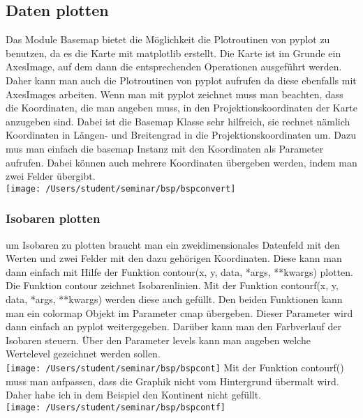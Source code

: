 \subsection{Daten plotten}
\label{sec:potdata}
Das Module \textsf{Basemap} bietet die Möglichkeit die Plotroutinen von \textsf{pyplot} zu benutzen, da es die Karte mit \textsf{matplotlib} erstellt. Die Karte ist im Grunde ein \textsf{AxesImage}, auf dem dann die entsprechenden Operationen ausgeführt werden. Daher kann man auch die Plotroutinen von \textsf{pyplot} aufrufen da diese ebenfalls mit \textsf{AxesImages} arbeiten. Wenn man mit \textsf{pyplot} zeichnet muss man beachten, dass die Koordinaten, die man angeben muss, in den Projektionskoordinaten der Karte anzugeben sind. Dabei ist die \textsf{Basemap} Klasse sehr hilfreich, sie rechnet nämlich Koordinaten in Längen- und Breitengrad in die Projektionskoordinaten um. Dazu mus man einfach die \textsf{basemap} Instanz mit den Koordinaten als Parameter aufrufen. Dabei können auch mehrere Koordinaten übergeben werden, indem man zwei Felder übergibt.\\

\texttt{[image: /Users/student/seminar/bsp/bspconvert]}\newpage
\subsubsection{Isobaren plotten}
um Isobaren zu plotten braucht man ein zweidimensionales Datenfeld mit den Werten und zwei Felder mit den dazu gehörigen Koordinaten. Diese kann man dann einfach mit Hilfe der Funktion \textsf{contour(x, y, data, *args, **kwargs)} plotten. Die Funktion \textsf{contour} zeichnet Isobarenlinien. Mit der Funktion \textsf{contourf(x, y, data, *args, **kwargs)} werden diese auch gefüllt. Den beiden Funktionen kann man ein \textsf{colormap} Objekt im Parameter \textsf{cmap} übergeben. Dieser Parameter wird dann einfach an \textsf{pyplot} weitergegeben. Darüber kann man den Farbverlauf der Isobaren steuern. Über den Parameter \textsf{levels} kann man angeben welche Wertelevel gezeichnet werden sollen.\\

\texttt{[image: /Users/student/seminar/bsp/bspcont]}
Mit der Funktion \textsf{contourf()} muss man aufpassen, dass die Graphik nicht vom Hintergrund übermalt wird. Daher habe ich in dem Beispiel den Kontinent nicht gefüllt.\\

\texttt{[image: /Users/student/seminar/bsp/bspcontf]}\newpage 
